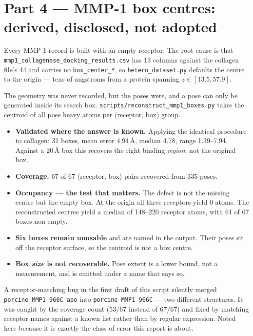 \documentclass[11pt,a4paper]{article}
\newcommand{\ok}[1]{\textcolor{okgreen}{#1}}
\newcommand{\bad}[1]{\textcolor{badred}{#1}}
\newcommand{\code}[1]{\texttt{\small #1}}
\begin{document}
\section{Part 4 --- MMP-1 box centres: derived, disclosed, not adopted}

Every MMP-1 record is built with an empty receptor. The root cause is that
\code{mmp1\_collagenase\_docking\_results.csv} has 13 columns against the
collagen file's 44 and carries no \code{box\_center\_*}, so
\code{hetero\_dataset.py} defaults the centre to the origin --- tens of
angstroms from a protein spanning $z \in [13.5, 57.9]$.

The geometry was never recorded, but the poses were, and a pose can only be
generated inside its search box. \code{scripts/reconstruct\_mmp1\_boxes.py}
takes the centroid of all pose heavy atoms per (receptor, box) group.

\begin{itemize}\itemsep2pt
  \item \textbf{Validated where the answer is known.} Applying the identical
        procedure to collagen: 31 boxes, \ok{mean error 4.94\,\AA},
        median 4.78, range 1.39--7.94. Against a 20\,\AA{} box this recovers
        the right binding \emph{region}, not the original box.
  \item \textbf{Coverage.} \ok{67 of 67} (receptor, box) pairs recovered from
        335 poses.
  \item \textbf{Occupancy --- the test that matters.} The defect is not the
        missing centre but the empty box. At the origin all three receptors
        yield \bad{0 atoms}. The reconstructed centres yield a median of
        \ok{148--220 receptor atoms}, with \ok{61 of 67} boxes non-empty.
  \item \textbf{Six boxes remain unusable} and are named in the output. Their
        poses sit off the receptor surface, so the centroid is not a box
        centre.
  \item \textbf{Box \emph{size} is not recoverable.} Pose extent is a lower
        bound, not a measurement, and is emitted under a name that says so.
\end{itemize}

A receptor-matching bug in the first draft of this script silently merged
\code{porcine\_MMP1\_966C\_apo} into \code{porcine\_MMP1\_966C} --- two
different structures. It was caught by the coverage count (53/67 instead of
67/67) and fixed by matching receptor names against a known list rather than
by regular expression. Noted here because it is exactly the class of error
this report is about.
\end{document}
